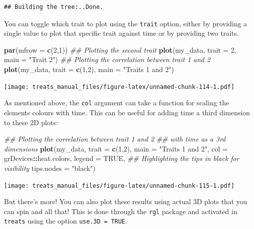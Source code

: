 \documentclass[
]{book}
\newenvironment{Shaded}{\begin{snugshade}}{\end{snugshade}}
\newcommand{\CommentTok}[1]{\textcolor[rgb]{0.56,0.35,0.01}{\textit{#1}}}
\newcommand{\DataTypeTok}[1]{\textcolor[rgb]{0.13,0.29,0.53}{#1}}
\newcommand{\DecValTok}[1]{\textcolor[rgb]{0.00,0.00,0.81}{#1}}
\newcommand{\KeywordTok}[1]{\textcolor[rgb]{0.13,0.29,0.53}{\textbf{#1}}}
\newcommand{\NormalTok}[1]{#1}
\newcommand{\OperatorTok}[1]{\textcolor[rgb]{0.81,0.36,0.00}{\textbf{#1}}}
\newcommand{\OtherTok}[1]{\textcolor[rgb]{0.56,0.35,0.01}{#1}}
\newcommand{\StringTok}[1]{\textcolor[rgb]{0.31,0.60,0.02}{#1}}
\begin{document}
\begin{verbatim}
## Building the tree:..Done.
\end{verbatim}

You can toggle which trait to plot using the \texttt{trait} option, either by providing a single value to plot that specific trait against time or by providing two traits.

\begin{Shaded}
\begin{Highlighting}[]
\KeywordTok{par}\NormalTok{(}\DataTypeTok{mfrow =} \KeywordTok{c}\NormalTok{(}\DecValTok{2}\NormalTok{,}\DecValTok{1}\NormalTok{))}
\CommentTok{\#\# Plotting the second trait}
\KeywordTok{plot}\NormalTok{(my\_data, }\DataTypeTok{trait =} \DecValTok{2}\NormalTok{, }\DataTypeTok{main =} \StringTok{"Trait 2"}\NormalTok{)}
\CommentTok{\#\# Plotting the correlation between trait 1 and 2}
\KeywordTok{plot}\NormalTok{(my\_data, }\DataTypeTok{trait =} \KeywordTok{c}\NormalTok{(}\DecValTok{1}\NormalTok{,}\DecValTok{2}\NormalTok{), }\DataTypeTok{main =} \StringTok{"Traits 1 and 2"}\NormalTok{)}
\end{Highlighting}
\end{Shaded}

\texttt{[image: treats\_manual\_files/figure-latex/unnamed-chunk-114-1.pdf]}

As mentioned above, the \texttt{col} argument can take a function for scaling the elements colours with time.
This can be useful for adding time a third dimension to these 2D plots:

\begin{Shaded}
\begin{Highlighting}[]
\CommentTok{\#\# Plotting the correlation between trait 1 and 2}
\CommentTok{\#\# with time as a 3rd dimensions}
\KeywordTok{plot}\NormalTok{(my\_data, }\DataTypeTok{trait =} \KeywordTok{c}\NormalTok{(}\DecValTok{1}\NormalTok{,}\DecValTok{2}\NormalTok{), }\DataTypeTok{main =} \StringTok{"Traits 1 and 2"}\NormalTok{,}
     \DataTypeTok{col =}\NormalTok{ grDevices}\OperatorTok{::}\NormalTok{heat.colors, }\DataTypeTok{legend =} \OtherTok{TRUE}\NormalTok{,}
     \CommentTok{\#\# Highlighting the tips in black for visibility}
     \DataTypeTok{tips.nodes =} \StringTok{"black"}\NormalTok{)}
\end{Highlighting}
\end{Shaded}

\texttt{[image: treats\_manual\_files/figure-latex/unnamed-chunk-115-1.pdf]}

But there's more! You can also plot these results using actual 3D plots that you can spin and all that!
This is done through the \texttt{rgl} package and activated in \texttt{treats} using the option \texttt{use.3D\ =\ TRUE}.
\end{document}
